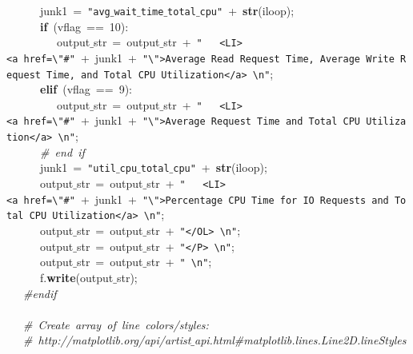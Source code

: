 \mbox{}\ \ \ \ \ \ junk1\ =\ \texttt{"{}avg$\_$wait$\_$time$\_$total$\_$cpu"{}}\ +\ \textbf{str}(iloop); \\
\mbox{}\ \ \ \ \ \ \textbf{if}\ (vflag\ ==\ 10): \\
\mbox{}\ \ \ \ \ \ \ \ \ output$\_$str\ =\ output$\_$str\ +\ \texttt{"{}\ \ \ \textless{}LI\textgreater{}\textless{}a\ href=\textbackslash{}"{}\#"{}}\ +\ junk1\ +\ \texttt{"{}\textbackslash{}"{}\textgreater{}Average\ Read\ Request\ Time,\ Average\ Write\ Request\ Time,\ and\ Total\ CPU\ Utilization\textless{}/a\textgreater{}\ \textbackslash{}n"{}}; \\
\mbox{}\ \ \ \ \ \ \textbf{elif}\ (vflag\ ==\ 9): \\
\mbox{}\ \ \ \ \ \ \ \ \ output$\_$str\ =\ output$\_$str\ +\ \texttt{"{}\ \ \ \textless{}LI\textgreater{}\textless{}a\ href=\textbackslash{}"{}\#"{}}\ +\ junk1\ +\ \texttt{"{}\textbackslash{}"{}\textgreater{}Average\ Request\ Time\ and\ Total\ CPU\ Utilization\textless{}/a\textgreater{}\ \textbackslash{}n"{}}; \\
\mbox{}\ \ \ \ \ \ \textit{\#\ end\ if} \\
\mbox{}\ \ \ \ \ \ junk1\ =\ \texttt{"{}util$\_$cpu$\_$total$\_$cpu"{}}\ +\ \textbf{str}(iloop); \\
\mbox{}\ \ \ \ \ \ output$\_$str\ =\ output$\_$str\ +\ \texttt{"{}\ \ \ \textless{}LI\textgreater{}\textless{}a\ href=\textbackslash{}"{}\#"{}}\ +\ junk1\ +\ \texttt{"{}\textbackslash{}"{}\textgreater{}Percentage\ CPU\ Time\ for\ IO\ Requests\ and\ Total\ CPU\ Utilization\textless{}/a\textgreater{}\ \textbackslash{}n"{}}; \\
\mbox{}\ \ \ \ \ \ output$\_$str\ =\ output$\_$str\ +\ \texttt{"{}\textless{}/OL\textgreater{}\ \textbackslash{}n"{}}; \\
\mbox{}\ \ \ \ \ \ output$\_$str\ =\ output$\_$str\ +\ \texttt{"{}\textless{}/P\textgreater{}\ \textbackslash{}n"{}}; \\
\mbox{}\ \ \ \ \ \ output$\_$str\ =\ output$\_$str\ +\ \texttt{"{}\ \textbackslash{}n"{}}; \\
\mbox{}\ \ \ \ \ \ f.\textbf{write}(output$\_$str); \\
\mbox{}\ \ \ \textit{\#endif} \\
\mbox{}\ \ \  \\
\mbox{}\ \ \ \textit{\#\ Create\ array\ of\ line\ colors/styles:} \\
\mbox{}\ \ \ \textit{\#\ http://matplotlib.org/api/artist$\_$api.html\#matplotlib.lines.Line2D.lineStyles} \\
